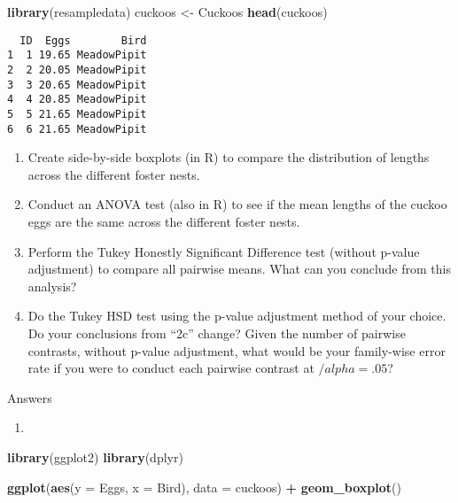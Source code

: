 \documentclass[]{article}
\newenvironment{Shaded}{\begin{snugshade}}{\end{snugshade}}
\newcommand{\KeywordTok}[1]{\textcolor[rgb]{0.13,0.29,0.53}{\textbf{#1}}}
\newcommand{\DataTypeTok}[1]{\textcolor[rgb]{0.13,0.29,0.53}{#1}}
\newcommand{\StringTok}[1]{\textcolor[rgb]{0.31,0.60,0.02}{#1}}
\newcommand{\OperatorTok}[1]{\textcolor[rgb]{0.81,0.36,0.00}{\textbf{#1}}}
\newcommand{\NormalTok}[1]{#1}
\providecommand{\tightlist}{%
  \setlength{\itemsep}{0pt}\setlength{\parskip}{0pt}}
\begin{document}
\begin{Shaded}
\begin{Highlighting}[]
\KeywordTok{library}\NormalTok{(resampledata)}
\NormalTok{cuckoos <-}\StringTok{ }\NormalTok{Cuckoos}
\KeywordTok{head}\NormalTok{(cuckoos)}
\end{Highlighting}
\end{Shaded}

\begin{verbatim}
  ID  Eggs        Bird
1  1 19.65 MeadowPipit
2  2 20.05 MeadowPipit
3  3 20.65 MeadowPipit
4  4 20.85 MeadowPipit
5  5 21.65 MeadowPipit
6  6 21.65 MeadowPipit
\end{verbatim}

\begin{enumerate}
\def\labelenumi{\alph{enumi}.}
\tightlist
\item
  Create side-by-side boxplots (in R) to compare the distribution of
  lengths across the different foster nests.
\item
  Conduct an ANOVA test (also in R) to see if the mean lengths of the
  cuckoo eggs are the same across the different foster nests.
\item
  Perform the Tukey Honestly Significant Difference test (without
  p-value adjustment) to compare all pairwise means. What can you
  conclude from this analysis?
\item
  Do the Tukey HSD test using the p-value adjustment method of your
  choice. Do your conclusions from ``2c'' change? Given the number of
  pairwise contrasts, without p-value adjustment, what would be your
  family-wise error rate if you were to conduct each pairwise contrast
  at \(/alpha = .05\)?
\end{enumerate}

Answers

\begin{enumerate}
\def\labelenumi{\alph{enumi}.}
\item
\end{enumerate}

\begin{Shaded}
\begin{Highlighting}[]
\KeywordTok{library}\NormalTok{(ggplot2)}
\KeywordTok{library}\NormalTok{(dplyr)}

\KeywordTok{ggplot}\NormalTok{(}\KeywordTok{aes}\NormalTok{(}\DataTypeTok{y =}\NormalTok{ Eggs, }\DataTypeTok{x =}\NormalTok{ Bird), }\DataTypeTok{data =}\NormalTok{ cuckoos) }\OperatorTok{+}\StringTok{ }\KeywordTok{geom_boxplot}\NormalTok{()}
\end{Highlighting}
\end{Shaded}
\end{document}
